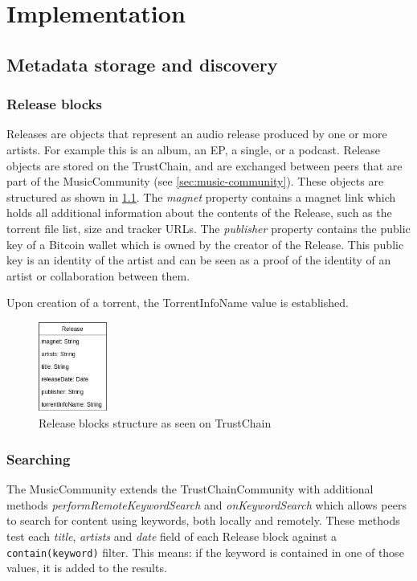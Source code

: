 \chapter{Implementation}

\section{Metadata storage and discovery}
\subsection{Release blocks}
Releases are objects that represent an audio release produced by one or more artists. For example this is an album, an EP, a single, or a podcast. Release objects are stored on the TrustChain, and are exchanged between peers that are part of the MusicCommunity (see \ref{sec:music-community}). These objects are structured as shown in \ref{fig:release-implementation}. The \textit{magnet} property contains a magnet link which holds all additional information about the contents of the Release, such as the torrent file list, size and tracker URLs. The \textit{publisher} property contains the public key of a Bitcoin wallet which is owned by the creator of the Release. This public key is an identity of the artist and can be seen as a proof of the identity of an artist or collaboration between them. 

Upon creation of a torrent, the TorrentInfoName value is established. 
\begin{figure}
    \includegraphics[width=0.2\textwidth]{implementation/release-implementation.png}
    \caption{Release blocks structure as seen on TrustChain}
    \label{fig:release-implementation}
\end{figure}

\subsection{Searching}
The MusicCommunity extends the TrustChainCommunity with additional methods \textit{performRemoteKeywordSearch} and \textit{onKeywordSearch} which allows peers to search for content using keywords, both locally and remotely. These methods test each \textit{title}, \textit{artists} and \textit{date} field of each Release block against a \verb|contain(keyword)| filter. This means: if the keyword is contained in one of those values, it is added to the results.

